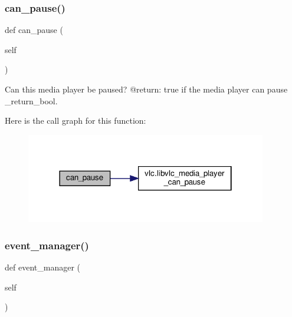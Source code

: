 \subsubsection{\texorpdfstring{can\+\_\+pause()}{can\_pause()}}
{\footnotesize\ttfamily def can\+\_\+pause (\begin{DoxyParamCaption}\item[{}]{self }\end{DoxyParamCaption})}

\begin{DoxyVerb}Can this media player be paused?
@return: true if the media player can pause \libvlc_return_bool.
\end{DoxyVerb}
 Here is the call graph for this function\+:
\nopagebreak
\begin{figure}[H]
\begin{center}
\leavevmode
\includegraphics[width=298pt]{classvlc_1_1_media_player_a134c27b04cf84027842f7e0a830908e7_cgraph}
\end{center}
\end{figure}
\mbox{\label{classvlc_1_1_media_player_ab7c92812cd259eb8e4e4fd292b81bfaa}} 
\subsubsection{\texorpdfstring{event\+\_\+manager()}{event\_manager()}}
{\footnotesize\ttfamily def event\+\_\+manager (\begin{DoxyParamCaption}\item[{}]{self }\end{DoxyParamCaption})}

